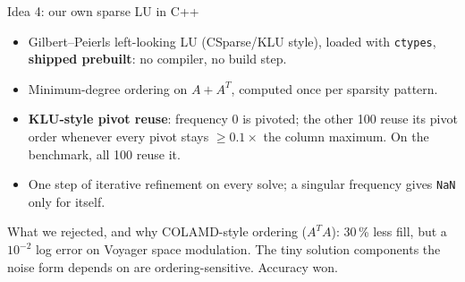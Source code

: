 \documentclass[aspectratio=169,11pt]{beamer}
\newcommand{\hl}[1]{\textcolor{accent}{\textbf{#1}}}
\begin{document}
\begin{frame}{Idea 4: our own sparse LU in C++}
  \begin{itemize}
    \item Gilbert--Peierls left-looking LU (CSparse/KLU style), loaded with \texttt{ctypes}, \hl{shipped prebuilt}: no compiler, no build step.
    \item Minimum-degree ordering on $A+A^T$, computed once per sparsity pattern.
    \item \hl{KLU-style pivot reuse}: frequency 0 is pivoted; the other 100 reuse its pivot order whenever every pivot stays $\ge 0.1\times$ the column maximum. On the benchmark, all 100 reuse it.
    \item One step of iterative refinement on every solve; a singular frequency gives \texttt{NaN} only for itself.
  \end{itemize}
  \vspace{0.6em}
  \begin{block}{What we rejected, and why}
    COLAMD-style ordering ($A^TA$): 30\,\% less fill, but a $10^{-2}$ log error on Voyager space modulation. The tiny solution components the noise form depends on are ordering-sensitive. Accuracy won.
  \end{block}
\end{frame}
\end{document}
